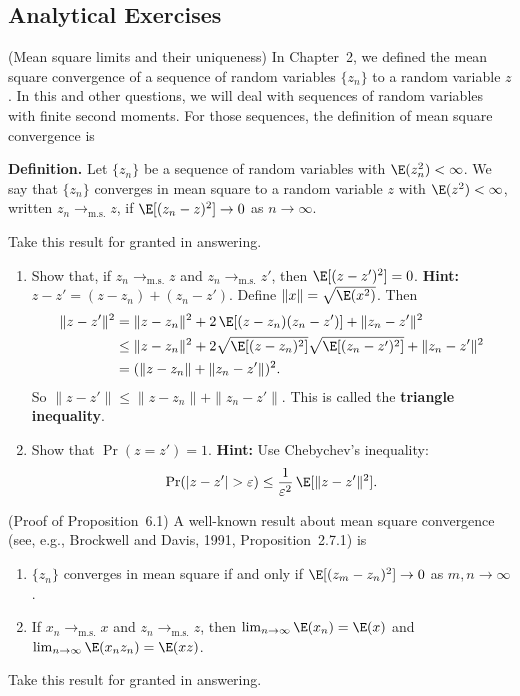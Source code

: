 
\begin{problemset}

\subsection*{Analytical Exercises}

\exercise[1] (Mean square limits and their uniqueness) \; In Chapter~2, we defined the mean
square convergence of a sequence of random variables $\{z_n\}$ to a random variable $z$.
In this and other questions, we will deal with sequences of random
variables with finite second moments. For those sequences, the definition of
mean square convergence is

\medskip
\noindent\textbf{Definition.} Let $\{z_n\}$ be a sequence of random variables with $\E(z_n^2) < \infty$.
We say that $\{z_n\}$ converges in mean square to a random variable $z$ with $\E(z^2) <
\infty$, written $z_n \to_{\mathrm{m.s.}} z$, if $\E[(z_n - z)^2] \to 0$ as $n \to \infty$.

\medskip
Take this result for granted in answering.

\begin{enumerate}[label=(\alph*)]
\item Show that, if $z_n \to_{\mathrm{m.s.}} z$ and $z_n \to_{\mathrm{m.s.}} z'$, then $\E[(z - z')^2] = 0$.
\textbf{Hint:} $z - z' = (z - z_n) + (z_n - z')$. Define $\|x\| = \sqrt{\E(x^2)}$. Then
\begin{align*}
  \|z - z'\|^2 &= \|z - z_n\|^2 + 2\,\E[(z - z_n)(z_n - z')] + \|z_n - z'\|^2 \\
  &\leq \|z - z_n\|^2 + 2\sqrt{\E[(z - z_n)^2]}\sqrt{\E[(z_n - z')^2]} + \|z_n - z'\|^2 \\
  &= (\|z - z_n\| + \|z_n - z'\|)^2.
\end{align*}
So $\|z - z'\| \leq \|z - z_n\| + \|z_n - z'\|$. This is called the \textbf{triangle inequality}.

\item Show that $\Pr(z = z') = 1$. \textbf{Hint:} Use Chebychev's inequality:
\[
  \Pr(|z - z'| > \varepsilon) \leq \frac{1}{\varepsilon^2}\,\E[\|z - z'\|^2].
\]
\end{enumerate}

\exercise[2] (Proof of Proposition~6.1) \; A well-known result about mean square convergence
(see, e.g., Brockwell and Davis, 1991, Proposition~2.7.1) is
\begin{enumerate}[label=(\roman*)]
\item $\{z_n\}$ converges in mean square if and only if $\E[(z_m - z_n)^2] \to 0$ as $m, n \to \infty$.
\item If $x_n \to_{\mathrm{m.s.}} x$ and $z_n \to_{\mathrm{m.s.}} z$, then
$\lim_{n \to \infty} \E(x_n) = \E(x)$ and $\lim_{n \to \infty} \E(x_n z_n) = \E(xz)$.
\end{enumerate}
Take this result for granted in answering.


\end{problemset}

